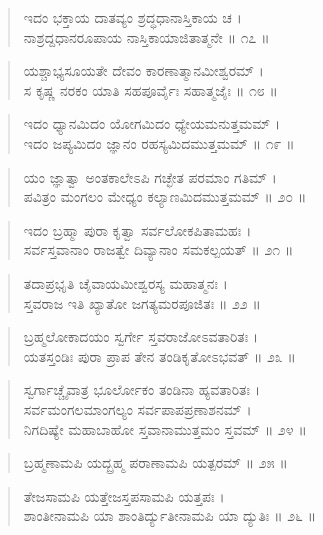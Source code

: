 \begin{verse}
ಇದಂ ಭಕ್ತಾಯ ದಾತವ್ಯಂ ಶ್ರದ್ಧಧಾನಾಸ್ತಿಕಾಯ ಚ ।\\ನಾಶ್ರದ್ದಧಾನರೂಪಾಯ ನಾಸ್ತಿಕಾಯಾಜಿತಾತ್ಮನೇ \num{॥ ೧೭ ॥}
\end{verse}

\begin{verse}
ಯಶ್ಚಾಭ್ಯಸೂಯತೇ ದೇವಂ ಕಾರಣಾತ್ಮಾನಮೀಶ್ವರಮ್ ।\\ಸ ಕೃಷ್ಣ ನರಕಂ ಯಾತಿ ಸಹಪೂರ್ವೈಃ ಸಹಾತ್ಮಜೈಃ \num{॥ ೧೮ ॥}
\end{verse}

\begin{verse}
ಇದಂ ಧ್ಯಾನಮಿದಂ ಯೋಗಮಿದಂ ಧ್ಯೇಯಮನುತ್ತಮಮ್ ।\\ಇದಂ ಜಪ್ಯಮಿದಂ ಜ್ಞಾನಂ ರಹಸ್ಯಮಿದಮುತ್ತಮಮ್ \num{॥ ೧೯ ॥}
\end{verse}

\begin{verse}
ಯಂ ಜ್ಞಾತ್ವಾ ಅಂತಕಾಲೇಽಪಿ ಗಚ್ಛೇತ ಪರಮಾಂ ಗತಿಮ್ ।\\ಪವಿತ್ರಂ ಮಂಗಲಂ ಮೇಧ್ಯಂ ಕಲ್ಯಾಣಮಿದಮುತ್ತಮಮ್ \num{॥ ೨೦ ॥}
\end{verse}

\begin{verse}
ಇದಂ ಬ್ರಹ್ಮಾ ಪುರಾ ಕೃತ್ವಾ ಸರ್ವಲೋಕಪಿತಾಮಹಃ ।\\ಸರ್ವಸ್ತವಾನಾಂ ರಾಜತ್ವೇ ದಿವ್ಯಾನಾಂ ಸಮಕಲ್ಪಯತ್ \num{॥ ೨೧ ॥}
\end{verse}

\begin{verse}
ತದಾಪ್ರಭೃತಿ ಚೈವಾಯಮೀಶ್ವರಸ್ಯ ಮಹಾತ್ಮನಃ ।\\ಸ್ತವರಾಜ ಇತಿ ಖ್ಯಾತೋ ಜಗತ್ಯಮರಪೂಜಿತಃ \num{॥ ೨೨ ॥}
\end{verse}

\begin{verse}
ಬ್ರಹ್ಮಲೋಕಾದಯಂ ಸ್ವರ್ಗೇ ಸ್ತವರಾಜೋಽವತಾರಿತಃ ।\\ಯತಸ್ತಂಡಿಃ ಪುರಾ ಪ್ರಾಪ ತೇನ ತಂಡಿಕೃತೋಽಭವತ್ \num{॥ ೨೩ ॥}
\end{verse}

\begin{verse}
ಸ್ವರ್ಗಾಚ್ಚೈವಾತ್ರ ಭೂರ್ಲೋಕಂ ತಂಡಿನಾ ಹ್ಯವತಾರಿತಃ ।\\ಸರ್ವಮಂಗಲಮಾಂಗಲ್ಯಂ ಸರ್ವಪಾಪಪ್ರಣಾಶನಮ್ ।\\ನಿಗದಿಷ್ಯೇ ಮಹಾಬಾಹೋ ಸ್ತವಾನಾಮುತ್ತಮಂ ಸ್ತವಮ್ \num{॥ ೨೪ ॥}
\end{verse}

\begin{verse}
ಬ್ರಹ್ಮಣಾಮಪಿ ಯದ್ಬ್ರಹ್ಮ ಪರಾಣಾಮಪಿ ಯತ್ಪರಮ್ \num{॥ ೨೫ ॥}
\end{verse}

\begin{verse}
ತೇಜಸಾಮಪಿ ಯತ್ತೇಜಸ್ತಪಸಾಮಪಿ ಯತ್ತಪಃ ।\\ಶಾಂತೀನಾಮಪಿ ಯಾ ಶಾಂತಿರ್ದ್ಯುತೀನಾಮಪಿ ಯಾ ದ್ಯುತಿಃ \num{॥ ೨೬ ॥}
\end{verse}

